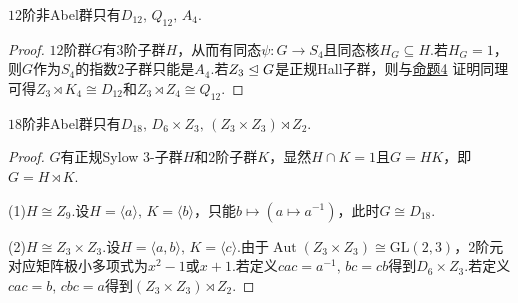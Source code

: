 \begin{prop}
	$12$阶非Abel群只有$D_{12},\,Q_{12},\,A_4$.
\end{prop}
\begin{proof}
	$12$阶群$G$有$3$阶子群$H$，从而有同态$\psi\colon G\to S_4$且同态核$H_G\subseteq H$.若$H_G=1$，则$G$作为$S_4$的指数$2$子群只能是$A_4$.若$Z_3\trianglelefteq G$是正规Hall子群，则与\hyperlink{prop:4pGroupStruc}{命题4} 证明同理可得$Z_3\rtimes K_4\cong D_{12}$和$Z_3\rtimes Z_4\cong Q_{12}$.
\end{proof}
\begin{prop}
	$18$阶非Abel群只有$D_{18},\,D_6\times Z_3,\,(Z_3\times Z_3)\rtimes Z_2$.
\end{prop}
\begin{proof}
	$G$有正规Sylow $3$-子群$H$和$2$阶子群$K$，显然$H\cap K=1$且$G=HK$，即$G=H\rtimes K$.

	(1)$H\cong Z_9$.设$H=\langle a\rangle,\,K=\langle b\rangle $，只能$b\mapsto(a\mapsto a^{-1})$，此时$G\cong D_{18}$.

	(2)$H\cong Z_3\times Z_3$.设$H=\langle a,b\rangle,\,K=\langle c\rangle $.由于$\operatorname*{Aut}(Z_3\times Z_3)\cong\mathrm{GL}(2,3)$，$2$阶元对应矩阵极小多项式为$x^2-1$或$x+1$.若定义$cac=a^{-1},\,bc=cb$得到$D_6\times Z_3$.若定义$cac=b,\,cbc=a$得到$(Z_3\times Z_3)\rtimes Z_2$.
\end{proof}

